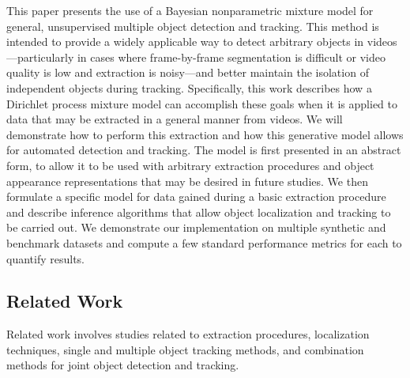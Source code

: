 \documentclass[smallcondensed, final]{svjour3}
\begin{document}
This paper presents the use of a Bayesian nonparametric mixture model for general, unsupervised multiple object detection and tracking. This method is intended to provide a widely applicable way to detect arbitrary objects in videos---particularly in cases where frame-by-frame segmentation is difficult or video quality is low and extraction is noisy---and better maintain the isolation of independent objects during tracking. Specifically, this work describes how a Dirichlet process mixture model can accomplish these goals when it is applied to data that may be extracted in a general manner from videos. We will demonstrate how to perform this extraction and how this generative model allows for automated detection and tracking. The model is first presented in an abstract form, to allow it to be used with arbitrary extraction procedures and object appearance representations that may be desired in future studies. We then formulate a specific model for data gained during a basic extraction procedure and describe inference algorithms that allow object localization and tracking to be carried out. We demonstrate our implementation on multiple synthetic and benchmark datasets and compute a few standard performance metrics for each to quantify results.






\subsection{Related Work}
\label{sec:relatedwork}

Related work involves studies related to extraction procedures, localization techniques, single and multiple object tracking methods, and combination methods for joint object detection and tracking.
\end{document}
